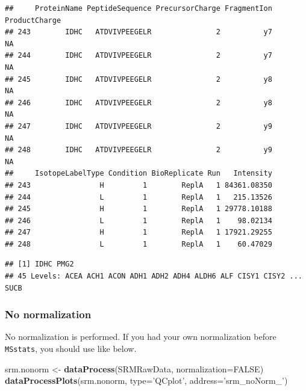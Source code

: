 \documentclass[]{book}
\newenvironment{Shaded}{\begin{snugshade}}{\end{snugshade}}
\newcommand{\DataTypeTok}[1]{\textcolor[rgb]{0.13,0.29,0.53}{#1}}
\newcommand{\KeywordTok}[1]{\textcolor[rgb]{0.13,0.29,0.53}{\textbf{#1}}}
\newcommand{\NormalTok}[1]{#1}
\newcommand{\OperatorTok}[1]{\textcolor[rgb]{0.81,0.36,0.00}{\textbf{#1}}}
\newcommand{\OtherTok}[1]{\textcolor[rgb]{0.56,0.35,0.01}{#1}}
\newcommand{\StringTok}[1]{\textcolor[rgb]{0.31,0.60,0.02}{#1}}
\begin{document}
\begin{verbatim}
##     ProteinName PeptideSequence PrecursorCharge FragmentIon ProductCharge
## 243        IDHC   ATDVIVPEEGELR               2          y7            NA
## 244        IDHC   ATDVIVPEEGELR               2          y7            NA
## 245        IDHC   ATDVIVPEEGELR               2          y8            NA
## 246        IDHC   ATDVIVPEEGELR               2          y8            NA
## 247        IDHC   ATDVIVPEEGELR               2          y9            NA
## 248        IDHC   ATDVIVPEEGELR               2          y9            NA
##     IsotopeLabelType Condition BioReplicate Run   Intensity
## 243                H         1        ReplA   1 84361.08350
## 244                L         1        ReplA   1   215.13526
## 245                H         1        ReplA   1 29778.10188
## 246                L         1        ReplA   1    98.02134
## 247                H         1        ReplA   1 17921.29255
## 248                L         1        ReplA   1    60.47029
\end{verbatim}

\begin{Shaded}
\end{Shaded}

\begin{verbatim}
## [1] IDHC PMG2
## 45 Levels: ACEA ACH1 ACON ADH1 ADH2 ADH4 ALDH6 ALF CISY1 CISY2 ... SUCB
\end{verbatim}

\hypertarget{no-normalization-1}{%
\subsubsection{No normalization}\label{no-normalization-1}}

No normalization is performed. If you had your own normalization before \texttt{MSstats}, you should use like below.

\begin{Shaded}
\begin{Highlighting}[]
\NormalTok{srm.nonorm <-}\StringTok{ }\KeywordTok{dataProcess}\NormalTok{(SRMRawData, }\DataTypeTok{normalization=}\OtherTok{FALSE}\NormalTok{)}
\KeywordTok{dataProcessPlots}\NormalTok{(srm.nonorm, }\DataTypeTok{type=}\StringTok{'QCplot'}\NormalTok{, }\DataTypeTok{address=}\StringTok{'srm_noNorm_'}\NormalTok{)}
\end{Highlighting}
\end{Shaded}
\end{document}
